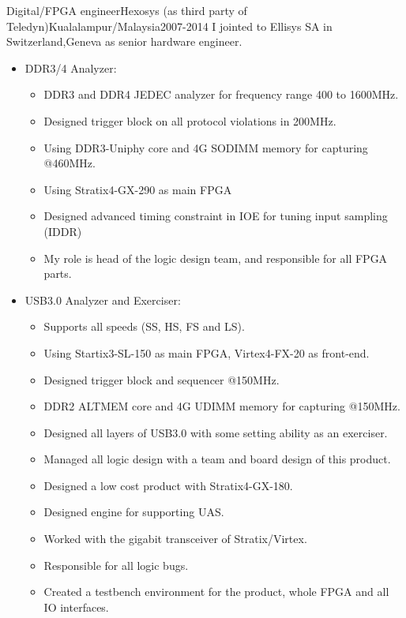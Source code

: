 \documentclass[10pt, a4paper]{article}
\begin{document}
\begin{cvitem}{Digital/FPGA engineer}{Hexosys {(as third party of Teledyn)}}{Kualalampur/Malaysia}{2007-2014}
    I jointed to Ellisys SA in Switzerland,Geneva as senior hardware engineer.
    \begin{itemize}
        \item DDR3/4 Analyzer:
        \begin{itemize}
            \item DDR3 and DDR4 JEDEC analyzer for frequency range 400 to 1600MHz.
            \item Designed trigger block on all protocol violations in 200MHz.
            \item Using DDR3-Uniphy core and 4G SODIMM memory for capturing @460MHz.
            \item Using Stratix4-GX-290 as main FPGA
            \item Designed advanced timing constraint in IOE for tuning input sampling (IDDR)
            \item My role is head of the logic design team, and responsible for all FPGA parts.
        \end{itemize}
        \item USB3.0 Analyzer and Exerciser:
        \begin{itemize}
            \item Supports all speeds (SS, HS, FS and LS).
            \item Using Startix3-SL-150 as main FPGA, Virtex4-FX-20 as front-end.
            \item Designed trigger block and sequencer @150MHz.
            \item DDR2 ALTMEM core and 4G UDIMM memory for capturing @150MHz.
            \item Designed all layers of USB3.0 with some setting ability as an exerciser.
            \item Managed all logic design with a team and board design of this product.
            \item Designed a low cost product with Stratix4-GX-180.
            \item Designed engine for supporting UAS.
            \item Worked with the gigabit transceiver of Stratix/Virtex.
            \item Responsible for all logic bugs.
            \item Created a testbench environment for the product, whole FPGA and all IO interfaces.

\end{itemize}
\end{itemize}
\end{cvitem}
\end{document}
